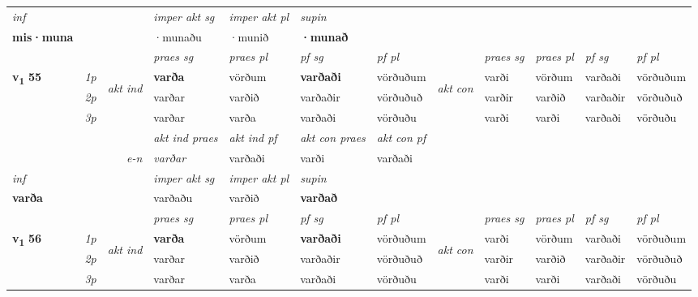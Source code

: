 \begin{longtable}[l]{X>{\footnotesize\itshape}llXXXXlXXXX}
   {\textit{inf}} & &  & \textit{imper akt sg} & \textit{imper akt pl}    & \textit{supin}   \\*
  {\textbf{mis\allowbreak ·muna}} & && ·munaðu  & ·munið    &  \textbf{·munað}   \\*

\midrule

 & &   & \textit{praes sg}  & \textit{praes pl}    & \textit{ pf sg} & \textit{pf pl} & & \textit{praes sg}  & \textit{praes pl}    & \textit{pf sg} & \textit{pf pl }  \\ \cmidrule{4-7} \cmidrule{9-12}
 \multirow{2}{*}{{{\textbf{v{\textsubscript{1}}} \Large{\textbf{55}}}}}  & 1p & \multirow{3}{*}{\begin{turn}{90}\textit{akt ind}\end{turn}} & \textbf{varða} & vörðum & \textbf{varðaði} & vörðuðum & \multirow{3}{*}{\begin{turn}{90}\textit{akt con}\end{turn}} &varði & vörðum & varðaði & vörðuðum\\*
 & 2p &  &  varðar  & varðið & varðaðir & vörðuðuð & & varðir & varðið & varðaðir & vörðuðuð \\*
 & 3p &  & varðar & varða & varðaði & vörðuðu & & varði & varði& varðaði & vörðuðu \\*
\cmidrule{4-7} \cmidrule{9-12}

   && &  \textit{akt ind praes} & \textit{akt ind pf} & \textit{akt con praes} & \textit{akt con pf} \\*
\multicolumn{3}{r}{\textit{e-n}} & varðar & varðaði & varði & varðaði \\*

\cmidrule{4-7}
   {\textit{inf}} & &  & \textit{imper akt sg} & \textit{imper akt pl}    & \textit{supin}   \\*
  {\textbf{varða}} & && varðaðu  & varðið    &  \textbf{varðað}   \\*

\midrule

 & &   & \textit{praes sg}  & \textit{praes pl}    & \textit{ pf sg} & \textit{pf pl} & & \textit{praes sg}  & \textit{praes pl}    & \textit{pf sg} & \textit{pf pl }  \\ \cmidrule{4-7} \cmidrule{9-12}
 \multirow{2}{*}{{{\textbf{v{\textsubscript{1}}} \Large{\textbf{56}}}}}  & 1p & \multirow{3}{*}{\begin{turn}{90}\textit{akt ind}\end{turn}} & \textbf{varða} & vörðum & \textbf{varðaði} & vörðuðum & \multirow{3}{*}{\begin{turn}{90}\textit{akt con}\end{turn}} &varði & vörðum & varðaði & vörðuðum\\*
 & 2p &  &  varðar  & varðið & varðaðir & vörðuðuð & & varðir & varðið & varðaðir & vörðuðuð \\*
 & 3p &  & varðar & varða & varðaði & vörðuðu & & varði & varði& varðaði & vörðuðu \\*
\cmidrule{4-7} \cmidrule{9-12}


\end{longtable}
